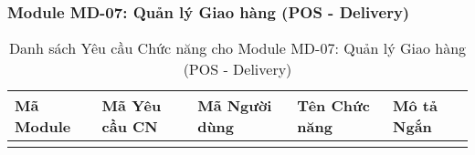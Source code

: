 \subsubsection{Module MD-07: Quản lý Giao hàng (POS - Delivery)}

\begin{longtable}{|m{2cm}|m{2.5cm}|m{2.5cm}|m{4.5cm}|m{4cm}|}
\caption{Danh sách Yêu cầu Chức năng cho Module MD-07: Quản lý Giao hàng (POS - Delivery)} \label{tab:fr_md07} \\
\hline
\textbf{Mã Module} & \textbf{Mã Yêu cầu CN} & \textbf{Mã Người dùng} & \textbf{Tên Chức năng} & \textbf{Mô tả Ngắn} \\
\hline
\endhead %

\hline
\endfoot %

\hline
\endlastfoot %


\end{longtable}

